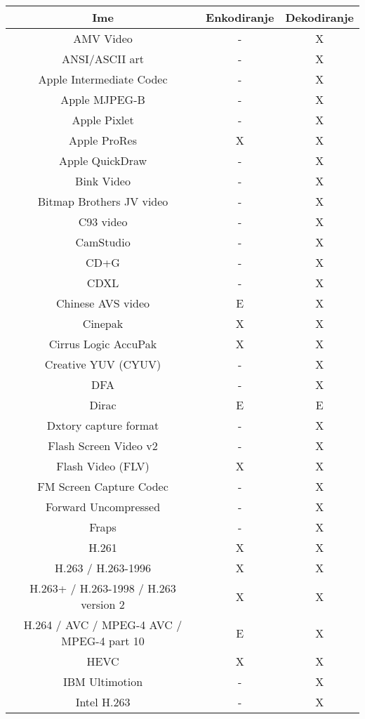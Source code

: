   \begin{table}[h]
    \begin{minipage}{\textwidth}
      \tiny
      \centering
    \begin{tabular}{|c|c|c|}
      \hline
      Ime & Enkodiranje & Dekodiranje \\
      \hline
      AMV Video & - & X \\
      ANSI/ASCII art & - & X \\
      Apple Intermediate Codec & - & X \\
      Apple MJPEG-B & - & X \\
      Apple Pixlet & - & X \\
      Apple ProRes & X & X \\
      Apple QuickDraw & - & X \\
      Bink Video & - & X \\
      Bitmap Brothers JV video & - & X \\
      C93 video & - & X \\
      CamStudio & - & X \\
      CD+G & - & X \\
      CDXL & - & X \\
      Chinese AVS video & E & X \\
      Cinepak & X & X \\
      Cirrus Logic AccuPak & X & X \\
      Creative YUV (CYUV) & - & X \\
      DFA & - & X \\
      Dirac & E & E \\
      Dxtory capture format & - & X \\
      Flash Screen Video v2 & - & X \\
      Flash Video (FLV) & X & X \\
      FM Screen Capture Codec & - & X \\
      Forward Uncompressed & - & X \\
      Fraps & - & X \\
      H.261 & X & X \\
      H.263 / H.263-1996 & X & X \\
      H.263+ / H.263-1998 / H.263 version 2 & X & X \\
      H.264 / AVC / MPEG-4 AVC / MPEG-4 part 10 & E & X \\
      HEVC & X & X \\
      IBM Ultimotion & - & X \\
      Intel H.263 & - & X \\

\end{tabular}
\end{minipage}
\end{table}
